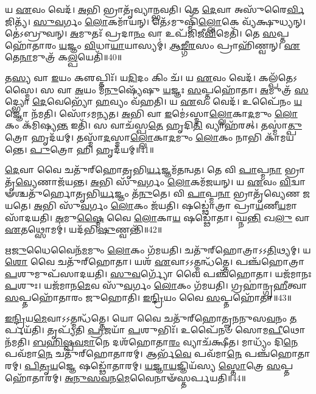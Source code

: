 𑌯 \ul{𑌏}\-𑌵𑌂 𑌵𑍇𑌦᳴।
\-\ul{𑌅}\-𑌭𑌿 𑌭𑍍𑌰𑌾𑌤𑍃᳴𑌵𑍍𑌯𑌾𑌨𑍍𑌭𑌵𑌤𑌿।
𑌤𑍇 \ul{𑌦𑍇}\-𑌵𑌾 𑌅𑌸𑍁᳴𑌰𑍈\-\ul{𑌰𑍍𑌵𑌿}\-𑌜𑌿𑌤𑍍𑌯᳴।
\-\ul{𑌸𑍁}\-\-\ul{𑌵}\-𑌰𑍍𑌗𑌂 \ul{𑌲𑍋}\-𑌕𑌮𑌾᳴𑌯𑌨𑍍।
𑌤𑍇᳴𑌽𑌮𑍁𑌷𑍍𑌮𑌿𑌁᳴\-\ul{𑌲𑍍𑌲𑍋}\-𑌕𑍇 𑌵𑍍𑌯᳴𑌕𑍍𑌷𑍁𑌧𑍍𑌯𑌨𑍍।
𑌤𑍇॑𑌽𑌬𑍍𑌰𑍁𑌵𑌨𑍍।
\-\ul{𑌅}\-𑌮𑍁𑌤𑌃᳴ 𑌪𑍍𑌰𑌦𑌾\-\ul{𑌨𑌂} 𑌵𑌾 𑌉𑌪᳴𑌜𑌿𑌜𑍀\-\ul{𑌵𑌿}\-𑌮𑍇𑌤𑌿᳴।
𑌤𑍇 \ul{𑌸}\-𑌪𑍍𑌤𑌹𑍋᳴𑌤𑌾𑌰𑌂 \ul{𑌯}\-𑌜𑍍𑌞𑌂 \ul{𑌵𑌿}\-𑌧𑌾\-\ul{𑌯𑌾}\-𑌯𑌾𑌸𑍍𑌯𑌮𑍍॑।
\-\ul{𑌆}\-\-\ul{𑌙𑍍𑌗𑍀}\-\-\ul{𑌰}\-𑌸𑌂 𑌪𑍍𑌰𑌾𑌹𑌿᳴𑌣𑍍𑌵𑌨𑍍।
\-\ul{𑌏}\-𑌤𑍇\-\ul{𑌨𑌾}\-𑌮𑍁𑌤𑍍𑌰᳴ 𑌕\-\ul{𑌲𑍍𑌪}\-𑌯𑍇𑌤𑌿᳴॥40॥

𑌤\-\ul{𑌸𑍍𑌯} 𑌵𑌾 \ul{𑌇}\-𑌯𑌂 𑌕𑍢𑌪𑍍𑌤𑌿𑌃᳴।
𑌯\-\ul{𑌦𑌿}\-𑌦𑌂 𑌕𑌿𑌂 𑌚᳴।
𑌯 \ul{𑌏}\-𑌵𑌂 𑌵𑍇𑌦᳴।
𑌕𑌲𑍍𑌪᳴𑌤𑍇\-𑌽𑌸𑍍𑌮𑍈।
𑌸 𑌵𑌾 \ul{𑌅}\-𑌯𑌂 𑌮᳴\-\ul{𑌨𑍁}\-𑌷𑍍𑌯𑍇᳴𑌷𑍁 \ul{𑌯}\-𑌜𑍍𑌞𑌃 \ul{𑌸}\-𑌪𑍍𑌤𑌹𑍋᳴𑌤𑌾।
\-\ul{𑌅}\-𑌮𑍁𑌤𑍍𑌰᳴ \ul{𑌸}\-𑌦𑍍𑌭𑍍𑌯𑍋 \ul{𑌦𑍇}\-𑌵𑍇𑌭𑍍𑌯𑍋᳴ \ul{𑌹}\-𑌵𑍍𑌯𑌂 𑌵᳴𑌹𑌤𑌿।
𑌯 \ul{𑌏}\-𑌵𑌂 𑌵𑍇𑌦᳴।
𑌉𑌪𑍈᳴𑌨𑌂 \ul{𑌯}\-𑌜𑍍𑌞𑍋 𑌨᳴𑌮𑌤𑌿।
𑌸𑍋᳴𑌽𑌮𑌨𑍍𑌯𑌤।
\-\ul{𑌅}\-𑌭𑌿 𑌵𑌾 \ul{𑌇}\-𑌮𑍇॑\-𑌽𑌸𑍍𑌮𑌾\-\ul{𑌲𑍍𑌲𑍋}\-𑌕𑌾\-\ul{𑌦}\-𑌮𑍁𑌂 \ul{𑌲𑍋}\-𑌕𑌂 𑌕᳴𑌮𑌿𑌷𑍍𑌯\-\ul{𑌨𑍍𑌤} 𑌇𑌤𑌿᳴।
𑌸 𑌵𑌾𑌚᳴𑌸𑍍𑌪\-\ul{𑌤𑍇} 𑌹𑍃𑌦𑌿\-\ul{𑌤𑌿} 𑌵𑍍𑌯𑌾𑌹᳴𑌰𑌤𑍍।
𑌤𑌸𑍍𑌮𑌾॑\-\ul{𑌤𑍍𑌪𑍁}\-𑌤𑍍𑌰𑍋 𑌹𑍃𑌦᳴𑌯𑌮𑍍।
𑌤𑌸𑍍𑌮𑌾᳴\-\ul{𑌦}\-𑌸𑍍𑌮𑌾\-\ul{𑌲𑍍𑌲𑍋}\-𑌕𑌾\-\ul{𑌦}\-𑌮𑍁𑌂 \ul{𑌲𑍋}\-𑌕𑌂 𑌨𑌾𑌭𑌿 𑌕𑌾᳴𑌮𑌯𑌨𑍍𑌤𑍇।
\-\ul{𑌪𑍁}\-𑌤𑍍𑌰𑍋 𑌹𑌿 𑌹𑍃𑌦᳴𑌯𑌮𑍍॥41॥\anuvakamend[𑌹𑍍𑌵𑌯𑍇᳴𑌤𑍇 𑌅𑌭𑌵𑌤𑍍𑌕\-\ul{𑌲𑍍𑌪}\-𑌯𑍇𑌤𑍀𑌤𑌿᳴ \ul{𑌚}\-𑌤𑍍𑌵𑌾𑌰𑌿᳴ 𑌚]

\-\ul{𑌦𑍇}\-𑌵𑌾 𑌵𑍈 𑌚𑌤𑍁᳴𑌰𑍍‌\mbox{}𑌹𑍋𑌤𑍃𑌭𑌿\-\ul{𑌰𑍍𑌯}\-𑌜𑍍𑌞𑌮᳴𑌤𑌨𑍍𑌵𑌤।
𑌤𑍇 𑌵𑌿 \ul{𑌪𑌾}\-𑌪𑍍𑌮\-\ul{𑌨𑌾} 𑌭𑍍𑌰𑌾𑌤𑍃᳴\-\ul{𑌵𑍍𑌯𑍇}\-𑌣𑌾𑌜᳴𑌯𑌨𑍍𑌤।
\-\ul{𑌅}\-𑌭𑌿 𑌸𑍁᳴\-\ul{𑌵}\-𑌰𑍍𑌗𑌂 \ul{𑌲𑍋}\-𑌕𑌮᳴𑌜𑌯𑌨𑍍।
𑌯 \ul{𑌏}\-𑌵𑌂 \ul{𑌵𑌿}\-𑌦𑍍𑌵𑌾𑍟𑌶𑍍𑌚𑌤𑍁᳴𑌰𑍍\mbox{}𑌹𑍋𑌤𑍃𑌭𑌿\-\ul{𑌰𑍍𑌯}\-𑌜𑍍𑌞𑌂 𑌤᳴\-\ul{𑌨𑍁}\-𑌤𑍇।
𑌵𑌿 \ul{𑌪𑌾}\-𑌪𑍍𑌮\-\ul{𑌨𑌾} 𑌭𑍍𑌰𑌾𑌤𑍃᳴𑌵𑍍𑌯𑍇𑌣 𑌜𑌯𑌤𑍇।
\-\ul{𑌅}\-𑌭𑌿 𑌸𑍁᳴\-\ul{𑌵}\-𑌰𑍍𑌗𑌂 \ul{𑌲𑍋}\-𑌕𑌂 𑌜᳴𑌯𑌤𑌿।
𑌷𑌡𑍍𑌢𑍋॑𑌤𑍍𑌰𑌾 𑌪𑍍𑌰𑌾\-\ul{𑌯}\-𑌣𑍀\-\ul{𑌯}\-𑌮𑌾 𑌸𑌾᳴𑌦𑌯𑌤𑌿।
\-\ul{𑌅}\-𑌮𑍁\-\ul{𑌷𑍍𑌮𑍈} 𑌵𑍈 \ul{𑌲𑍋}\-𑌕𑌾\-\ul{𑌯} 𑌷𑌡𑍍𑌢𑍋᳴𑌤𑌾।
𑌘𑍍𑌨\-\ul{𑌨𑍍𑌤𑌿} 𑌖\-\ul{𑌲𑍁} 𑌵𑌾 \ul{𑌏}\-𑌤𑌥𑍍𑌸𑍋𑌮𑌮𑍍॑।
𑌯𑌦᳴𑌭𑌿\-\ul{𑌷𑍁}\-𑌣𑍍𑌵𑌨𑍍𑌤𑌿᳴॥42॥

\-\ul{𑌋}\-\-\ul{𑌜𑍁}\-𑌧𑍈𑌵𑍈𑌨᳴\-\ul{𑌮}\-𑌮𑍁𑌂 \ul{𑌲𑍋}\-𑌕𑌂 𑌗᳴𑌮𑌯𑌤𑌿।
𑌚𑌤𑍁᳴𑌰𑍍‌\mbox{}𑌹𑍋𑌤𑍍𑌰𑌾\-𑌽𑌽\-\ul{𑌤𑌿}\-𑌥𑍍𑌯𑌮𑍍।
𑌯\-\ul{𑌶𑍋} 𑌵𑍈 𑌚𑌤𑍁᳴𑌰𑍍‌\mbox{}𑌹𑍋𑌤𑌾।
𑌯𑌶᳴ \ul{𑌏}\-𑌵𑌾𑌽𑌽𑌤𑍍𑌮𑌨𑍍𑌧᳴𑌤𑍍𑌤𑍇।
𑌪𑌞𑍍𑌚᳴𑌹𑍋𑌤𑍍𑌰𑌾 \ul{𑌪}\-𑌶𑍁𑌮𑍁𑌪᳴𑌸𑌾𑌦𑌯𑌤𑌿।
\-\ul{𑌸𑍁}\-\-\ul{𑌵}\-𑌰𑍍𑌗𑍍𑌯𑍋᳴ 𑌵𑍈 𑌪𑌞𑍍𑌚᳴𑌹𑍋𑌤𑌾।
𑌯𑌜᳴𑌮𑌾𑌨𑌃 \ul{𑌪}\-𑌶𑍁𑌃।
𑌯𑌜᳴𑌮𑌾𑌨\-\ul{𑌮𑍇}\-𑌵 𑌸𑍁᳴\-\ul{𑌵}\-𑌰𑍍𑌗𑌂 \ul{𑌲𑍋}\-𑌕𑌂 𑌗᳴𑌮𑌯𑌤𑌿।
𑌗𑍍𑌰𑌹𑌾॑𑌨𑍍𑌗𑍃\-\ul{𑌹𑍀}\-𑌤𑍍𑌵𑌾 \ul{𑌸}\-𑌪𑍍𑌤𑌹𑍋᳴𑌤𑌾𑌰𑌂 𑌜𑍁𑌹𑍋𑌤𑌿।
\-\ul{𑌇}\-\-\ul{𑌨𑍍𑌦𑍍𑌰𑌿}\-𑌯𑌂 𑌵𑍈 \ul{𑌸}\-𑌪𑍍𑌤𑌹𑍋᳴𑌤𑌾॥43॥

\-\ul{𑌇}\-\-\ul{𑌨𑍍𑌦𑍍𑌰𑌿}\-𑌯\-\ul{𑌮𑍇}\-𑌵𑌾𑌽𑌽𑌤𑍍𑌮𑌨𑍍𑌧᳴𑌤𑍍𑌤𑍇।
𑌯𑍋 𑌵𑍈 𑌚𑌤𑍁᳴𑌰𑍍‌\mbox{}𑌹𑍋𑌤𑍄𑌨𑌨𑍁𑌸\-\ul{𑌵}\-𑌨𑌂 \ul{𑌤}\-𑌰𑍍𑌪𑌯᳴𑌤𑌿।
𑌤𑍃𑌪𑍍𑌯᳴𑌤𑌿 \ul{𑌪𑍍𑌰}\-𑌜𑌯𑌾᳴ \ul{𑌪}\-𑌶𑍁𑌭𑌿𑌃᳴।
𑌉𑌪𑍈᳴𑌨𑍞 𑌸𑍋𑌮\-\ul{𑌪𑍀}\-𑌥𑍋 𑌨᳴𑌮𑌤𑌿।
\-\ul{𑌬}\-\-\ul{𑌹𑌿}\-\-\ul{𑌷𑍍𑌪}\-\-\ul{𑌵}\-\-\ul{𑌮𑌾}\-𑌨𑍇 𑌦𑌶᳴𑌹𑍋𑌤𑌾\-\ul{𑌰𑌂} 𑌵𑍍𑌯𑌾𑌚᳴𑌕𑍍𑌷𑍀𑌤।
𑌮𑌾𑌧𑍍𑌯𑌂᳴ 𑌦𑌿\-\ul{𑌨𑍇} 𑌪𑌵᳴𑌮𑌾\-\ul{𑌨𑍇} 𑌚𑌤𑍁᳴𑌰𑍍‌\mbox{}𑌹𑍋𑌤𑌾𑌰𑌮𑍍।
𑌆𑌰𑍍𑌭᳴\-\ul{𑌵𑍇} 𑌪𑌵᳴𑌮𑌾\-\ul{𑌨𑍇} 𑌪𑌞𑍍𑌚᳴𑌹𑍋𑌤𑌾𑌰𑌮𑍍।
\-\ul{𑌪𑌿}\-\-\ul{𑌤𑍃}\-\-\ul{𑌯}\-𑌜𑍍𑌞𑍇 𑌷𑌡𑍍𑌢𑍋᳴𑌤𑌾𑌰𑌮𑍍।
\-\ul{𑌯}\-\-\ul{𑌜𑍍𑌞𑌾}\-\-\ul{𑌯}\-𑌜𑍍𑌞𑌿𑌯᳴𑌸𑍍𑌯 \ul{𑌸𑍍𑌤𑍋}\-𑌤𑍍𑌰𑍇 \ul{𑌸}\-𑌪𑍍𑌤𑌹𑍋᳴𑌤𑌾𑌰𑌮𑍍।
\-\ul{𑌅}\-\-\ul{𑌨𑍁}\-\-\ul{𑌸}\-\-\ul{𑌵}\-𑌨\-\ul{𑌮𑍇}\-𑌵𑍈𑌨𑌾𑍟᳴𑌸𑍍𑌤𑌰𑍍𑌪𑌯𑌤𑌿॥44॥

